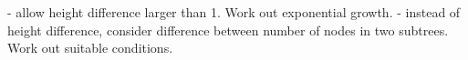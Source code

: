 - allow height difference larger than 1. Work out exponential growth.
- instead of height difference, consider difference between number of
nodes in two subtrees. Work out suitable conditions.